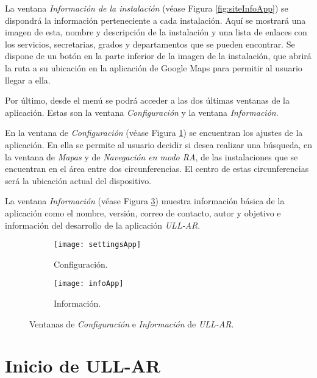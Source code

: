 La ventana \textit{Información de la instalación} (véase Figura \ref{fig:siteInfoApp}) se dispondrá la información perteneciente a cada instalación. Aquí se  mostrará una imagen de esta, nombre y descripción de la instalación y una lista de enlaces con los servicios, secretarias, grados y departamentos que se pueden encontrar. Se dispone de un botón en la parte inferior de la imagen de la instalación, que  abrirá la ruta a su ubicación en la aplicación de Google Maps para permitir al usuario llegar a ella.  

Por último, desde el menú se podrá acceder a las dos últimas ventanas de la aplicación. Estas son la ventana \textit{Configuración} y la ventana \textit{Información}.

En la ventana de \textit{Configuración} (véase Figura \ref{fig:settingsApp}) se encuentran los ajustes de la aplicación. En ella se permite al usuario decidir si desea realizar una búsqueda, en la ventana de \textit{Mapas} y de \textit{Navegación en modo RA}, de las instalaciones que se encuentran en el área entre dos circunferencias. El centro de estas circunferencias será la ubicación actual del dispositivo.

La ventana \textit{Información} (véase Figura \ref{fig:infoApp})  muestra información básica de la aplicación como el nombre, versión, correo de contacto, autor y objetivo e información del desarrollo de la aplicación \textit{ULL-AR}.  

\begin{figure}[h]
    \hspace*{\fill}%
    \begin{subfigure}[h]{0.35\linewidth}
    \texttt{[image: settingsApp]}
    \caption{Configuración.}
    \label{fig:settingsApp}
    \end{subfigure}
    \hfill%
    \begin{subfigure}[h]{0.35\linewidth}
    \texttt{[image: infoApp]}
    \caption{Información.}
    \label{fig:infoApp}
    \end{subfigure}%
    \caption{Ventanas de \textit{Configuración} e \textit{Información} de \textit{ULL-AR}.}
    \hspace*{\fill}%
\end{figure}

\vskip 1.9in

\section{Inicio de ULL-AR} \label{chap:StartApplication} 


